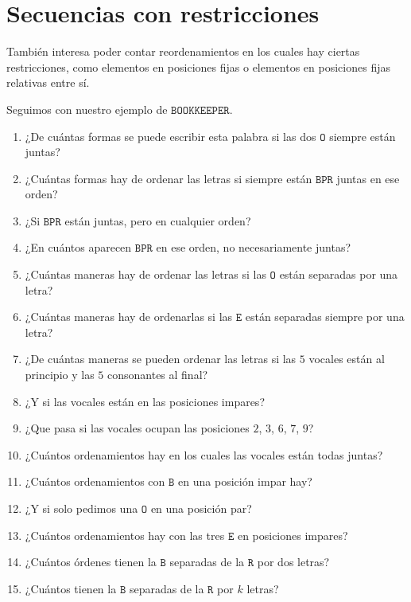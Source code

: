 %

\section{Secuencias con restricciones}
\label{sec:secuencias-restringidas}

  También interesa poder contar reordenamientos
  en los cuales hay ciertas restricciones,
  como elementos en posiciones fijas
  o elementos en posiciones fijas relativas entre sí.

  Seguimos con nuestro ejemplo de \(\mathtt{BOOKKEEPER}\).
  \begin{enumerate}
  \item
    ¿De cuántas formas se puede escribir esta palabra
    si las dos \(\mathtt{O}\) siempre están juntas?
  \item
    ¿Cuántas formas hay de ordenar las letras
    si siempre están \(\mathtt{BPR}\) juntas en ese orden?
  \item
    ¿Si \(\mathtt{BPR}\) están juntas,
    pero en cualquier orden?
  \item
    ¿En cuántos aparecen \(\mathtt{BPR}\) en ese orden,
    no necesariamente juntas?
  \item
    ¿Cuántas maneras hay de ordenar las letras
    si las \(\mathtt{O}\) están separadas por una letra?
  \item
    ¿Cuántas maneras hay de ordenarlas
    si las \(\mathtt{E}\) están separadas siempre por una letra?
  \item
    ¿De cuántas maneras se pueden ordenar las letras
    si las \(5\) vocales están al principio y las \(5\) consonantes al final?
  \item
    ¿Y si las vocales están en las posiciones impares?
  \item
    ¿Que pasa si las vocales
    ocupan las posiciones \(2\), \(3\), \(6\), \(7\), \(9\)?
  \item
    ¿Cuántos ordenamientos hay
    en los cuales las vocales están todas juntas?
  \item
    ¿Cuántos ordenamientos con \(\mathtt{B}\) en una posición impar hay?
  \item
    ¿Y si solo pedimos una \(\mathtt{O}\) en una posición par?
  \item
    ¿Cuántos ordenamientos hay con las tres \(\mathtt{E}\)
    en posiciones impares?
  \item
    ¿Cuántos órdenes tienen la \(\mathtt{B}\) separadas de la \(\mathtt{R}\)
    por dos letras?
  \item
    ¿Cuántos tienen la \(\mathtt{B}\) separadas de la \(\mathtt{R}\)
    por \(k\) letras?
  \end{enumerate}

